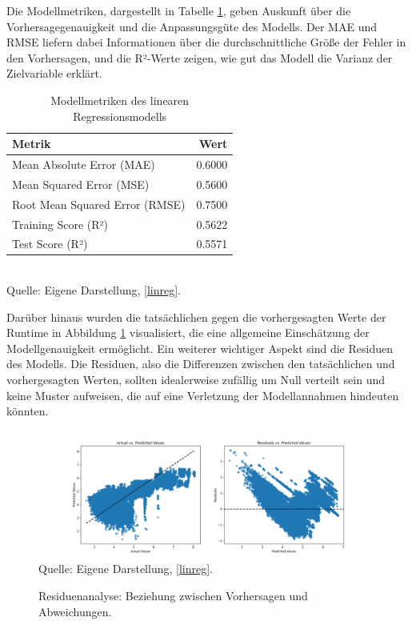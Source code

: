 Die Modellmetriken, dargestellt in Tabelle \ref{tab:model-metrics}, 
geben Auskunft über die Vorhersagegenauigkeit und die Anpassungsgüte des Modells. 
Der MAE und RMSE liefern dabei Informationen über die durchschnittliche Größe 
der Fehler in den Vorhersagen, und die R²-Werte zeigen, wie gut das Modell die Varianz 
der Zielvariable erklärt.

\begin{table}[!h]
    \caption{Modellmetriken des linearen Regressionsmodells}
    \begin{tabularx}{\textwidth}{Xr}
    \toprule
    Metrik & Wert \\
    \midrule
    Mean Absolute Error (MAE) & 0.6000 \\
    Mean Squared Error (MSE) & 0.5600 \\
    Root Mean Squared Error (RMSE) & 0.7500 \\
    Training Score (R²) & 0.5622 \\
    Test Score (R²) & 0.5571 \\
    \bottomrule
    \end{tabularx}
    \label{tab:model-metrics}
    \\ Quelle: Eigene Darstellung, \ref{linreg}.
\end{table}

Darüber hinaus wurden die tatsächlichen gegen die vorhergesagten Werte der Runtime
in Abbildung \ref{pic:residuals} visualisiert, die eine allgemeine Einschätzung der 
Modellgenauigkeit ermöglicht. Ein weiterer wichtiger Aspekt sind die Residuen des Modells. 
Die Residuen, also die Differenzen zwischen den tatsächlichen und vorhergesagten Werten, 
sollten idealerweise zufällig um Null verteilt sein und keine Muster aufweisen, 
die auf eine Verletzung der Modellannahmen hindeuten könnten.

\begin{figure}[!h]
    \caption{Residuenanalyse: Beziehung zwischen Vorhersagen und Abweichungen.}
    \includegraphics[width=1\textwidth]{../scripts/images/residuals_gpu.png}
    Quelle: Eigene Darstellung, \ref{linreg}.
    \label{pic:residuals}
\end{figure}

